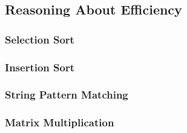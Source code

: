 \subsection{Reasoning About Efficiency}

\subsubsection{Selection Sort}

\subsubsection{Insertion Sort}

\subsubsection{String Pattern Matching}

\subsubsection{Matrix Multiplication}